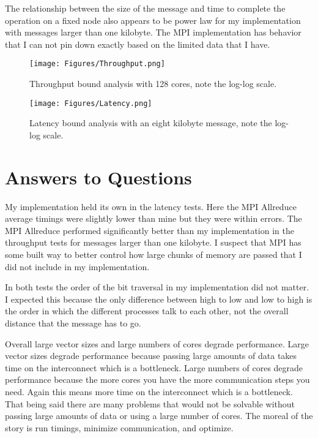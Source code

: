 \documentclass[11pt,a4paper,oneside]{report}
\begin{document}
The relationship between the size of the message and time to complete the operation on a fixed node also appears to be power law for my implementation with messages larger than one kilobyte.  The MPI implementation has behavior that I can not pin down exactly based on the limited data that I have.

\begin{figure}[htpb]
  \centering
  \texttt{[image: Figures/Throughput.png]}
  \caption{Throughput bound analysis with 128 cores, note the log-log scale.}
  \label{fig:throughput}
\end{figure}

\begin{figure}[htpb]
  \centering
  \texttt{[image: Figures/Latency.png]}
  \caption{Latency bound analysis with an eight kilobyte message, note the log-log scale.}
  \label{fig:latency}
\end{figure}

\section{Answers to Questions}
My implementation held its own in the latency tests.  Here the MPI Allreduce average timings were slightly lower than mine but they were within errors.   The MPI Allreduce performed significantly better than my implementation in the throughput tests for messages larger than one kilobyte.  I suspect that MPI has some built way to better control how large chunks of memory are passed that I did not include in my implementation.

In both tests the order of the bit traversal in my implementation did not matter.  I expected this because the only difference between high to low and low to high is the order in which the different processes talk to each other, not the overall distance that the message has to go.

Overall large vector sizes and large numbers of cores degrade performance.  Large vector sizes degrade performance because passing large amounts of data takes time on the interconnect which is a bottleneck.  Large numbers of cores degrade performance because the more cores you have the more communication steps you need.  Again this means more time on the interconnect which is a bottleneck.  That being said there are many problems that would not be solvable without passing large amounts of data or using a large number of cores.  The moreal of the story is run timings, minimize communication, and optimize.
\end{document}
